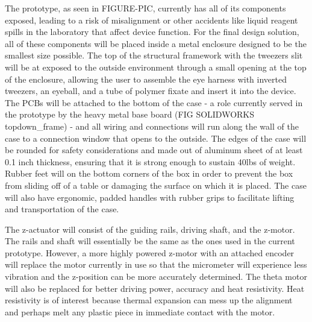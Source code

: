 \documentclass{article}
\begin{document}
The prototype, as seen in FIGURE-PIC, currently has all of its components exposed, leading to a risk of misalignment or other accidents like liquid reagent spills in the laboratory that affect device function.  For the final design solution, all of these components will be placed inside a metal enclosure designed to be the smallest size possible. The top of the structural framework with the tweezers slit will be at exposed to the outside environment through a small opening at the top of the enclosure, allowing the user to assemble the eye harness with inverted tweezers, an eyeball, and a tube of polymer fixate and insert it into the device. The PCBs will be attached to the bottom of the case - a role currently served in the prototype by the heavy metal base board (FIG SOLIDWORKS topdown_frame) -  and all wiring and connections will run along the wall of the case to a connection window that opens to the outside. The edges of the case will be rounded for safety considerations and made out of aluminum sheet of at least 0.1 inch thickness, ensuring that it is strong enough to sustain 40lbs of weight. Rubber feet will on the bottom corners of the box in order to prevent the box from sliding off of a table or damaging the surface on which it is placed. The case will also have ergonomic, padded handles with rubber grips to facilitate lifting and transportation of the case.  

The z-actuator will consist of the guiding rails, driving shaft, and the z-motor. The rails and shaft will essentially be the same as the ones used in the current prototype. However, a more highly powered z-motor with an attached encoder will replace the motor currently in use so that the micrometer will experience less vibration and the z-position can be more accurately determined. The theta motor will also be replaced for better driving power, accuracy and heat resistivity. Heat resistivity is of interest because thermal expansion can mess up the alignment and perhaps melt any plastic piece in immediate contact with the motor.
\end{document}
